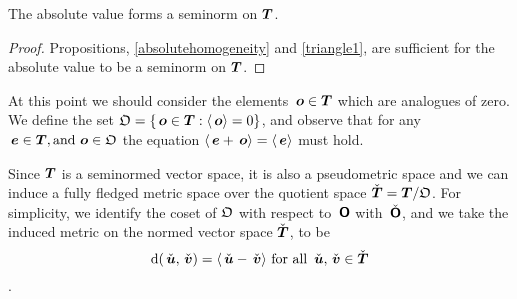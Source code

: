 \begin{corollary}\label{gseminorm}
  The absolute value forms a seminorm on $\boldsymbol{T}$.
  \begin{proof}  
    Propositions, \ref{absolutehomogeneity} and \ref{triangle1}, are 
    sufficient for the absolute value to be a seminorm on
    $\boldsymbol{T}$.
  \end{proof}
\end{corollary}

At this point we should consider the elements \(\,\boldsymbol{o}\in\boldsymbol{T}\)
which are analogues of zero. We define the set \(\mathfrak{O} =
\{\,\boldsymbol{o}\in\boldsymbol{T} : \langle{\,\boldsymbol{o}}\rangle = 0\}\), and observe that for any
\(\,\boldsymbol{e} \in \boldsymbol{T}, \operatorname{\text{and}} \,\boldsymbol{o} \in \mathfrak{O}\) the equation
\(\langle{\,\boldsymbol{e} + \,\boldsymbol{o}}\rangle = \langle{\,\boldsymbol{e}}\rangle\) must hold. 

Since $\boldsymbol{T}$ is a seminormed vector space, it is also a pseudometric
space and we can induce a fully fledged metric space over the quotient
space \(\check{\boldsymbol{T}} = \boldsymbol{T} / \mathfrak{O}\).
For simplicity, we identify the coset of $\mathfrak{O}$ with respect to
$\,\boldsymbol{\mathsf{O}}$ with $\,\check{\boldsymbol{\mathsf{O}}}$, and we take the induced metric on the
normed vector space $\check{\boldsymbol{T}}$, to be \[\operatorname{d}(\,\check{\boldsymbol{u}},\,\check{\boldsymbol{v}}) =
\langle{\,\check{\boldsymbol{u}} - \,\check{\boldsymbol{v}}}\rangle \text{ for all }\,\check{\boldsymbol{u}}, \,\check{\boldsymbol{v}} \in
\check{\boldsymbol{T}}\].


